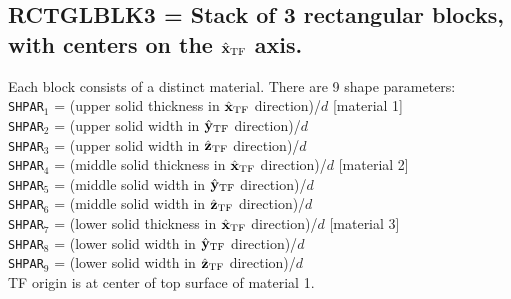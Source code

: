 \subsection{ RCTGLBLK3 = Stack of 3 rectangular blocks, with centers on
            the $\hat{\bf x}_{\rm TF}$ axis.
            \label{sec:RCTGLBLK3}}
        Each block consists of a distinct material.  There are 9 shape
	parameters:\\
        {\tt SHPAR$_1$} = (upper solid thickness in $\hat{\bf x}_{\rm TF}$ direction)/$d$ 
        [material 1]\\
        {\tt SHPAR$_2$} = (upper solid width in $\hat{\bf y}_{\rm TF}$ direction)/$d$\\
        {\tt SHPAR}$_3$ = (upper solid width in $\hat{\bf z}_{\rm TF}$ direction)/$d$\\
        {\tt SHPAR}$_4$ = (middle solid thickness in $\hat{\bf x}_{\rm TF}$ direction)/$d$ 
        [material 2]\\
        {\tt SHPAR}$_5$ = (middle solid width in $\hat{\bf y}_{\rm TF}$ direction)/$d$\\
        {\tt SHPAR}$_6$ = (middle solid width in $\hat{\bf z}_{\rm TF}$ direction)/$d$\\
        {\tt SHPAR}$_7$ = (lower solid thickness in $\hat{\bf x}_{\rm TF}$ direction)/$d$ 
        [material 3]\\
        {\tt SHPAR}$_8$ = (lower solid width in $\hat{\bf y}_{\rm TF}$ direction)/$d$\\
        {\tt SHPAR}$_9$ = (lower solid width in $\hat{\bf z}_{\rm TF}$ direction)/$d$\\
	TF origin is at center of top surface of material 1.
